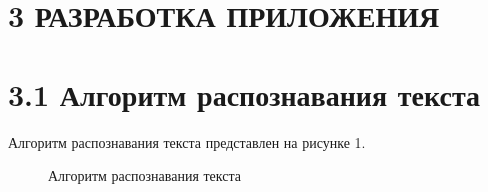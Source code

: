 \documentclass[14pt,a4paper]{extreport}
\begin{document}
	\section*{\normalsize\hspace{3ex} 3 РАЗРАБОТКА ПРИЛОЖЕНИЯ}
                  \section*{\normalsize\hspace{4ex} 3.1 Алгоритм распознавания текста}
\hspace{4ex} Алгоритм распознавания текста представлен на рисунке 1.                  
                  \begin{figure}[h!]
\caption{Алгоритм распознавания текста}
\end{figure}
\end{document}
